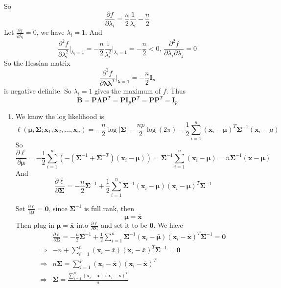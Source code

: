 \documentclass{article}
\begin{document}
\begin{enumerate}[leftmargin = 0 em, label = \arabic*., font = \bfseries]
\begin{enumerate}
	So
	\[\frac{\partial f}{\partial \lambda_i} = \frac{n}{2} \frac{1}{\lambda_i} - \frac{n}{2}\]
	Let $\frac{\partial f}{\partial \lambda_i} = 0$, we have $\lambda_i = 1$. And
	\[\frac{\partial^2 f}{\partial \lambda_i^2}\bigg|_{{\lambda_i} = 1} = - \frac{n}{2} \frac{1}{\lambda_i^2}\bigg|_{\lambda_i = 1}= -\frac{n}{2} < 0,\, \frac{\partial^2 f}{\partial \lambda_i \partial \lambda_j} = 0 \]
	So the Hessian matrix 
	\[\frac{\partial^2 f}{\partial \bm \lambda \bm \lambda^T}\bigg |_{\bm \lambda = \bm 1} = -\frac{n}{2} \bm I_p\]
	is negative definite. So $\lambda_i = 1$ gives the maximum of $f$. Thus
	\[\bm B = \bm P \bm \Lambda \bm P^T = \bm P \bm I_p \bm P^T = \bm P \bm P^T = \bm I_p\]
	\begin{enumerate}
		\item 
		We know the log likelihood is
		\[\ell(\bm \mu, \bm \Sigma ; \bm x_1 , \bm x_2, \ldots , \bm x_n )= -\frac{n}{2} \log |\bm \Sigma| - \frac{np}{2} \log (2 \pi) - \frac{1}{2} \sum_{i=1}^n (\bm x_i - \bm \mu)^T \bm \Sigma^{-1} (\bm x_i - \mu) \]
		So
		\[\frac{\partial \ell}{\partial \bm \mu} = - \frac{1}{2} \sum_{i=1}^n \left( - (\bm \Sigma^{-1} + \bm \Sigma^{-T})(\bm x_i - \bm \mu)\right) = \bm \Sigma^{-1} \sum_{i=1}^n (\bm x_i - \bm \mu) = n \bm \Sigma^{-1} (\bar{\bm x} - \bm \mu)\] 
		And
		\[\frac{\partial \ell}{\partial \bm \Sigma} = - \frac{n}{2} \bm \Sigma^{-1} + \frac{1}{2} \sum_{i=1}^n \bm \Sigma^{-1} (\bm x_i - \bm \mu) (\bm x_i - \bm \mu)^T \bm \Sigma^{-1}\]

		Set $\frac{\partial \ell}{\partial \bm \mu} = \bm 0$, since $\bm \Sigma^{-1}$ is full rank, then 
		\[\bm \mu = \bar{\bm x}\]
		Then plug in $\bm \mu = \bar{\bm x}$ into $\frac{\partial \ell}{\partial \bm \Sigma}$ and set it to be $\bm 0$. We have
				\begin{align*}
				&\frac{\partial \ell}{\partial \bm \Sigma} = - \frac{n}{2} \bm \Sigma^{-1} + \frac{1}{2} \sum_{i=1}^n \bm \Sigma^{-1} (\bm x_i - \bar{\bm \mu}) (\bm x_i - \bar{\bm x})^T \bm \Sigma^{-1} = \bm 0 \\
				\Rightarrow &-n + \sum_{i=1}^n (\bm x_i - \bar{x})(\bm x_i - \bar{x})^T \bm \Sigma^{-1} = \bm 0 \\
				\Rightarrow &n \bm \Sigma = \sum_{i=1}^p (\bm x_i - \bar{\bm x})(\bm x_i - \bar{\bm x})^T \\
				\Rightarrow & \bm \Sigma = \frac{\sum_{i=1}^n (\bm x_i - \bar{\bm x})(\bm x_i - \bar{\bm x})^T}{n}\end{align*}
	\end{enumerate}
	
\end{enumerate}

		\end{enumerate}










	
	
	
	
\end{document}
